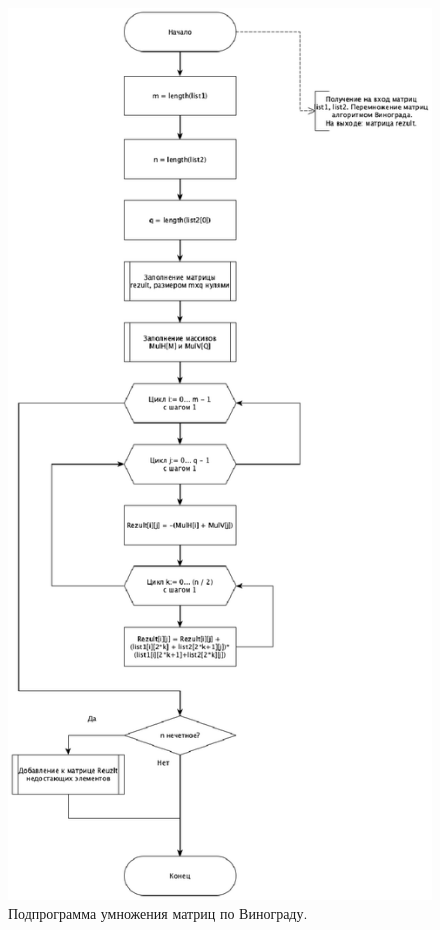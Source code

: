 \documentclass[12pt]{report}
\begin{document}
\begin{figure}[H]
	\centering
	\includegraphics[width=0.75\linewidth]{Grape_sub}
	\caption{Подпрограмма умножения матриц по Винограду.}
	\label{ris:image4}
\end{figure}

\newpage
\end{document}

